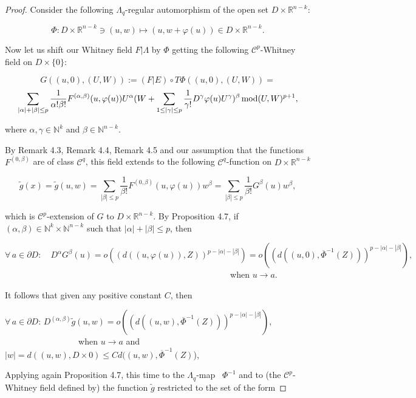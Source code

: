 \documentclass[12pt]{amsart}
\theoremstyle{definition}
\theoremstyle{remark}
\numberwithin{equation}{section}
\newcommand{\Real}{\mathbb R}
\begin{document}
\medskip
\noindent
\begin{proof} Consider the following $\varLambda_q$-regular automorphism of the open set $D\times \mathbb{R}^{n-k}$:

$$
\varPhi: D\times \mathbb{R}^{n-k}\ni (u, w)\longmapsto (u, w + \varphi(u))\in D\times \mathbb{R}^{n-k}.
$$

\medskip
\noindent
Now let us shift our Whitney field $F|\varLambda$ by $\varPhi$ getting the following $\mathcal{C}^p$-Whitney field on $D\times\{0\}$:

$$
G((u, 0), (U, W)):=(F|E)\circ T\varPhi((u, 0), (U, W)) =
$$
$$
\sum_{|\alpha|+|\beta|\leq p}\frac{1}{\alpha!\beta!}F^{(\alpha,\beta)}(u,\varphi(u))U^{\alpha}(W + \sum_{1\leq |\gamma|\leq p}\frac{1}{\gamma!}D^{\gamma}\varphi(u)U^{\gamma})^{\beta} \, {\rm mod}(U,W)^{p+1},
$$

\medskip
\noindent
where $\alpha, \gamma\in \mathbb{N}^k$ and $\beta\in \mathbb{N}^{n-k}$.

\medskip
By Remark 4.3, Remark 4.4, Remark 4.5 and our assumption that the functions $F^{(0,\beta)}$ are of class $\mathcal{C}^q$, this field extends to the following $\mathcal{C}^q$-function on $D\times \Real^{n-k}$

$$
\tilde{g}(x) = \tilde{g}(u, w) =\sum_{|\beta|\leq p}\frac{1}{\beta!}F^{(0,\beta)}(u,\varphi(u))w^{\beta}= \sum_{|\beta|\leq p}\frac{1}{\beta!}G^{\beta}(u)w^{\beta},
$$

\medskip
\noindent
which is $\mathcal{C}^p$-extension of $G$ to $D\times \mathbb{R}^{n-k}$. By Proposition 4.7, if $(\alpha, \beta)\in \mathbb{N}^k\times \mathbb{N}^{n-k}$ such that $|\alpha|+|\beta|\leq p$, then

$$
\forall \, a\in \partial D: \quad D^{\alpha}G^{\beta}(u) = o((d((u, \varphi(u)), Z))^{p-|\alpha|-|\beta|}) = o((d((u, 0), {\overline{\varPhi}}^{-1} (Z)))^{p-|\alpha|-|\beta|}),
$$
$\phantom{...............................................................................................}$when $u\longrightarrow a$.

\medskip
\noindent
It follows that given any positive constant $C$, then

$$
\forall \, a\in \partial D: \, D^{(\alpha,\beta)}\tilde{g}(u, w ) = o((d((u, w), {\overline{\varPhi}}^{-1} (Z)))^{p-|\alpha|-|\beta|}),\phantom{....................}
$$
$\phantom{...............................}$when $u\longrightarrow a$ and $|w| = d((u, w), D\times {0})\leq Cd((u, w), {\overline{\varPhi}}^{-1} (Z)$),

\bigskip
\noindent
Applying again Proposition 4.7, this time to the $\varLambda_q$-map \, $\varPhi^{-1}$ and to (the $\mathcal{C}^p$-Whitney field defined by) the function $\tilde{g}$ restricted to the set of the form


\end{proof}
\end{document}
